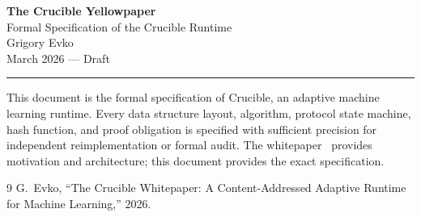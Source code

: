 \documentclass[11pt, a4paper]{article}
\theoremstyle{definition}
\theoremstyle{plain}
\theoremstyle{remark}
\begin{document}
\begin{center}
  \vspace*{1.2em}
  {\fontsize{22}{26}\selectfont\sffamily\bfseries The Crucible Yellowpaper}\\[0.6em]
  {\large\sffamily Formal Specification of the Crucible Runtime}\\[2em]
  {\normalsize Grigory Evko}\\[0.4em]
  {\small\textcolor{black!45}{March 2026 --- Draft}}\\[2em]
  {\color{black!20}\rule{0.35\textwidth}{0.4pt}}
\end{center}
\thispagestyle{empty}
\vspace{1em}

\noindent
This document is the formal specification of Crucible, an adaptive machine learning runtime.
Every data structure layout, algorithm, protocol state machine, hash function, and proof obligation
is specified with sufficient precision for independent reimplementation or formal audit.
The whitepaper~\cite{crucible-whitepaper} provides motivation and architecture;
this document provides the exact specification.

\tableofcontents
\newpage






















\begin{thebibliography}{9}
G.~Evko, ``The Crucible Whitepaper: A Content-Addressed Adaptive Runtime for Machine Learning,'' 2026.
\end{thebibliography}
\end{document}
